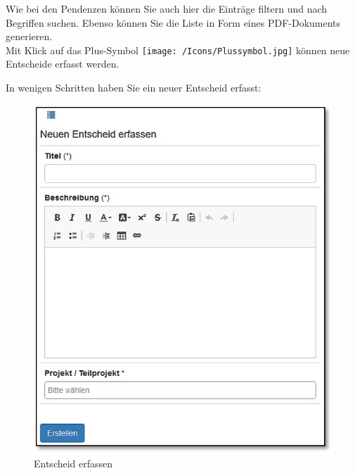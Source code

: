 Wie bei den Pendenzen können Sie auch hier die Einträge filtern und nach Begriffen suchen. Ebenso können Sie die Liste in Form eines PDF-Dokuments generieren. \\

Mit Klick auf das Plus-Symbol \texttt{[image: /Icons/Plussymbol.jpg]} können neue Entscheide erfasst werden.

\vspace{\baselineskip}

In wenigen Schritten haben Sie ein neuer Entscheid erfasst:

\vspace{\baselineskip}

\begin{figure}   %
  \vspace{-25pt}      %
  \begin{center}
    \includegraphics[width=1\linewidth]{../chapters/05_Sitzungswesen/pictures//5-5_EntscheidErfassen.jpg}
  \end{center}
  \caption{Entscheid erfassen}
\end{figure}
